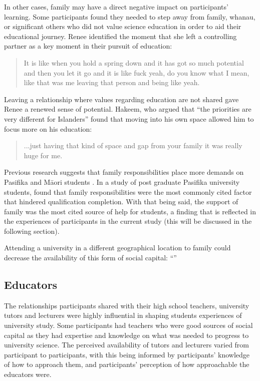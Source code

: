 In other cases, family may have a direct negative impact on participants' learning. Some participants found they needed to step away from family, whanau, or significant others who did not value science education in order to aid their educational journey. Renee identified the moment that she left a controlling partner as a key moment in their pursuit of education: \blockquote{It is like when you hold a spring down and it has got so much potential and then you let it go and it is like fuck yeah, do you know what I mean, like that was me leaving that person and being like yeah.}. Leaving a relationship where values regarding education are not shared gave Renee a renewed sense of potential. Hakeem, who argued that ``the priorities are very different for Islanders'' found that moving into his own space allowed him to focus more on his education: \blockquote{...just having that kind of space and gap from your family it was really huge for me.} Previous research suggests that family responsibilities place more demands on Pasifika and M\={a}ori students \citep{zepke2011non}. In a study of post graduate Pasifika university students, \cite{theodore2018pacific} found that family responsibilities were the most commonly cited factor that hindered qualification completion. With that being said, the support of family was the most cited source of help for students, a finding that is reflected in the experiences of participants in the current study (this will be discussed in the following section). 

Attending a university in a different geographical location to family could decrease the availability of this form of social capital: ``''



\subsection{Educators}
The relationships participants shared with their high school teachers, university tutors and lecturers were highly influential in shaping students experiences of university study. Some participants had teachers who were good sources of social capital as they had expertise and knowledge on what was needed to progress to university science. The perceived availability of tutors and lecturers varied from participant to participants, with this being informed by participants' knowledge of how to approach them, and participants' perception of how approachable the educators were. 

